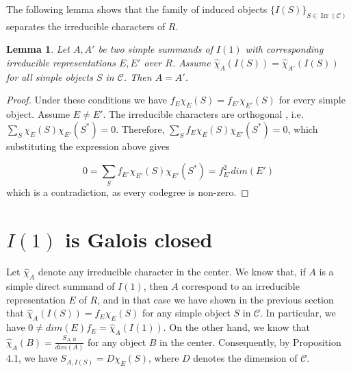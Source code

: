 \documentclass[a4paper,twoside,11pt]{amsart}
\newtheorem*{remark}{Remark}
\newtheorem{lemma}[theorem]{Lemma}
\theoremstyle{plain} %
\theoremstyle{definition}
\begin{document}
\medskip

The following lemma shows that the family of induced objects \(\{I(S)\}_{S\in\operatorname{Irr}(\mathcal C)}\) separates the irreducible characters of \(R\).
\begin{lemma}
 Let $A, A'$ be two simple summands of $I(1)$ with corresponding irreducible representations $E,E'$ over $R$. Assume $\widehat{\chi}_A (I(S))=\widehat{\chi}_{A'} (I(S))$ for all simple objects $S$ in $\mathcal{C}$. Then  $A=A'$.
\end{lemma}
\begin{proof}
        Under these conditions we have $f_E \chi_E (S)=f_{E'} \chi_{E'} (S)$ for every simple object. Assume $E\neq E'$. The irreducible characters are orthogonal \cite[Section 8.14]{EGNO}, i.e. $\sum_S \chi_E (S)\chi_{E'} (S^*)=0$. Therefore, $\sum_S f_E\chi_E (S)\chi_{E'} (S^*)=0$, which substituting the expression above gives

        \begin{equation}
            0=\sum_S f_{E'}\chi_{E'} (S)\chi_{E'} (S^*)=f_{E'}^2 dim(E')
        \end{equation}
        which is a contradiction, as every codegree is non-zero.
    \end{proof}
\bigskip



\section{$I(1)$ is Galois closed}

Let $\widehat{\chi}_A$ denote any irreducible character in the center. We know that, if $A$ is a simple direct summand of $I(1)$, then $A$ correspond to an irreducible representation $E$ of $R$, and in that case we have shown in the previous section that $\widehat{\chi}_A (I(S))=f_E \chi_E (S)$ for any simple object $S$ in $\mathcal{C}$. In particular, we have $0\neq dim(E)f_E=\widehat{\chi}_A (I(1))$.
On the other hand, we know that $\widehat{\chi}_A (B)=\frac{S_{A,B}}{dim(A)}$ for any object $B$ in the center. Consequently, by Proposition 4.1, we have $S_{A,I(S)}=D \chi_E (S)$, where $D$ denotes the dimension of $\mathcal{C}$.



    
\end{document}
